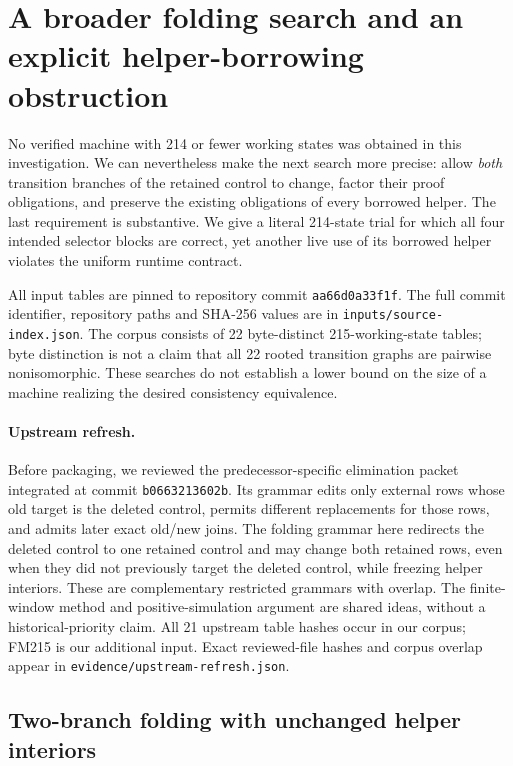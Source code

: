 \section{A broader folding search and an explicit helper-borrowing obstruction}
\label{sec:two-branch-folds}

No verified machine with 214 or fewer working states was obtained in this investigation. We can nevertheless make the next search more precise: allow \emph{both} transition branches of the retained control to change, factor their proof obligations, and preserve the existing obligations of every borrowed helper. The last requirement is substantive. We give a literal 214-state trial for which all four intended selector blocks are correct, yet another live use of its borrowed helper violates the uniform runtime contract.

All input tables are pinned to repository commit \texttt{aa66d0a33f1f}. The full commit identifier, repository paths and SHA-256 values are in \texttt{inputs/source-index.json}. The corpus consists of 22 byte-distinct 215-working-state tables; byte distinction is not a claim that all 22 rooted transition graphs are pairwise nonisomorphic. These searches do not establish a lower bound on the size of a machine realizing the desired consistency equivalence.


\paragraph{Upstream refresh.}
Before packaging, we reviewed the predecessor-specific elimination packet integrated at commit \texttt{b0663213602b}. Its grammar edits only external rows whose old target is the deleted control, permits different replacements for those rows, and admits later exact old/new joins. The folding grammar here redirects the deleted control to one retained control and may change both retained rows, even when they did not previously target the deleted control, while freezing helper interiors. These are complementary restricted grammars with overlap. The finite-window method and positive-simulation argument are shared ideas, without a historical-priority claim. All 21 upstream table hashes occur in our corpus; FM215 is our additional input. Exact reviewed-file hashes and corpus overlap appear in \texttt{evidence/upstream-refresh.json}.

\subsection{Two-branch folding with unchanged helper interiors}

